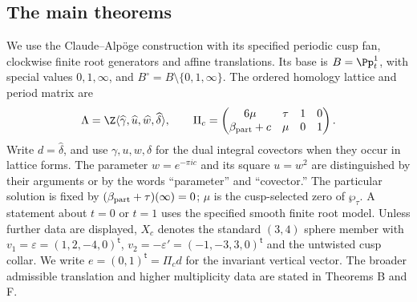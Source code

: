 
\subsection{The main theorems}
\label{series:I:main-theorems}

We use the Claude--Alp\"oge construction with its specified periodic
cusp fan, clockwise finite root generators and affine translations.
Its base is $B=\Pp^1_t$, with special values $0,1,\infty$, and
$B^\circ=B\setminus\{0,1,\infty\}$.  The ordered homology lattice and
period matrix are
\[
 \Lambda=\Z\langle\widehat\gamma,\widehat u,
                  \widehat w,\widehat\delta\rangle,
 \qquad
 \Pi_c=\begin{pmatrix}6\mu&\tau&1&0\\
                       \beta_{\rm part}+c&\mu&0&1\end{pmatrix}.
\]
Write $d=\widehat\delta$, and use $\gamma,u,w,\delta$ for the dual
integral covectors when they occur in lattice forms.  The parameter
$w=e^{-\pi i c}$ and its square $u=w^2$ are distinguished by their
arguments or by the words ``parameter'' and ``covector.''  The
particular solution is fixed by
$(\beta_{\rm part}+\tau)(\infty)=0$; $\mu$ is the cusp-selected
zero of $\wp_\tau$.  A statement about $t=0$ or $t=1$ uses the
specified smooth finite root model.  Unless further data are
displayed, $X_c$ denotes the standard $(3,4)$ sphere member with
$v_1=\varepsilon=(1,2,-4,0)^{\mathsf t}$,
$v_2=-\varepsilon'=(-1,-3,3,0)^{\mathsf t}$ and the untwisted
cusp collar.  We write $e=(0,1)^{\mathsf t}=\Pi_c d$ for the
invariant vertical vector.  The broader admissible translation and higher
multiplicity data are stated in Theorems B and F.

\hypertarget{main-I-A}{}
